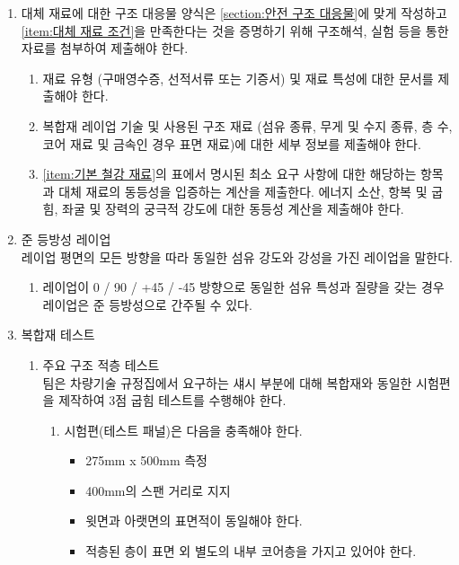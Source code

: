 \documentclass[final,a4paper,10pt]{report}
\begin{document}
\begin{enumerate}
  \item 대체 재료에 대한 구조 대응물 양식은 \cref{section:안전 구조 대응물}에 맞게 작성하고 \cref{item:대체 재료 조건}을 만족한다는 것을 증명하기 위해 구조해석, 실험 등을 통한 자료를 첨부하여 제출해야 한다.
    \begin{enumerate}
      \item 재료 유형 (구매영수증, 선적서류 또는 기증서) 및 재료 특성에 대한 문서를 제출해야 한다.
      \item 복합재 레이업 기술 및 사용된 구조 재료 (섬유 종류, 무게 및 수지 종류, 층 수, 코어 재료 및 금속인 경우 표면 재료)에 대한 세부 정보를 제출해야 한다.
      \item \cref{item:기본 철강 재료}의 표에서 명시된 최소 요구 사항에 대한 해당하는 항목과 대체 재료의 동등성을 입증하는 계산을 제출한다. 에너지 소산, 항복 및 굽힘, 좌굴 및 장력의 궁극적 강도에 대한 동등성 계산을 제출해야 한다.
    \end{enumerate}

  \item 준 등방성 레이업\\
    레이업 평면의 모든 방향을 따라 동일한 섬유 강도와 강성을 가진 레이업을 말한다. 
    \begin{enumerate}
      \item 레이업이 0 / 90 / +45 / -45 방향으로 동일한 섬유 특성과 질량을 갖는 경우 레이업은 준 등방성으로 간주될 수 있다.
    \end{enumerate}

  \item 복합재 테스트 \label{item:복합재 테스트}
    \begin{enumerate}
      \item 주요 구조 적층 테스트\\
      팀은 차량기술 규정집에서 요구하는 섀시 부분에 대해 복합재와 동일한 시험편을 제작하여 3점 굽힘 테스트를 수행해야 한다.
        \begin{enumerate}
          \item 시험편(테스트 패널)은 다음을 충족해야 한다.
            \begin{itemize}
              \item 275mm x 500mm 측정
              \item 400mm의 스팬 거리로 지지
              \item 윗면과 아랫면의 표면적이 동일해야 한다.
              \item 적층된 층이 표면 외 별도의 내부 코어층을 가지고 있어야 한다.
            \end{itemize}
            

\end{enumerate}
\end{enumerate}
\end{enumerate}
\end{document}
